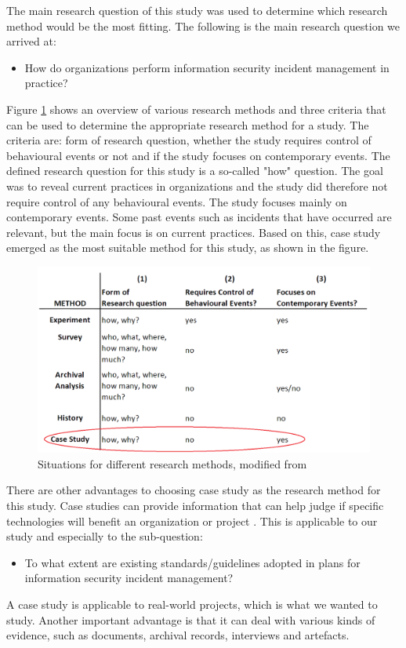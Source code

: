 The main research question of this study was used to determine which research method would be the most fitting. The following is the main research question we arrived at:

\begin{itemize}
\item How do organizations perform information security incident management in practice?
\end{itemize}

Figure \ref{fig:methods} shows an overview of various research methods and three criteria that can be used to determine the appropriate research method for a study. The criteria are: form of research question, whether the study requires control of behavioural events or not and if the study focuses on contemporary events. The defined research question for this study is a so-called "how" question. The goal was to reveal current practices in organizations and the study did therefore not require control of any behavioural events. The study focuses mainly on contemporary events. Some past events such as incidents that have occurred are relevant, but the main focus is on current practices. Based on this, case study emerged as the most suitable method for this study, as shown in the figure.

\begin{figure}[ht]
\begin{center}
\includegraphics[scale=0.35]{methods.png}
\caption[Situations for different research methods]{Situations for different research methods, modified from \cite{CaseStudyResearch}}
\label{fig:methods}
\end{center}
\end{figure}

There are other advantages to choosing case study as the research method for this study. Case studies can provide information that can help judge if specific technologies will benefit an organization or project \cite{kitchenham1995case}. This is applicable to our study and especially to the sub-question:

\begin{itemize}
\item To what extent are existing standards/guidelines adopted in plans for information security incident management?
\end{itemize}

A case study is applicable to real-world projects, which is what we wanted to study. Another important advantage is that it can deal with various kinds of evidence, such as documents, archival records, interviews and artefacts.